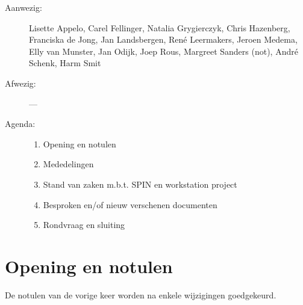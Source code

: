 

   \RosSupersedes{-}
   \MakeRosTitle
%
%
\begin{description}
\item[Aanwezig:] Lisette Appelo, Carel Fellinger, Natalia Grygierczyk,
                 Chris Hazenberg, Franciska de Jong, 
                 Jan Landsbergen, Ren\'{e} Leermakers, 
                 Jeroen Medema, Elly van Munster, 
                 Jan Odijk, Joep Rous, Margreet Sanders (not),
                 Andr\'{e} Schenk, Harm Smit
\item[Afwezig:]  ---
\item[Agenda:]\mbox{}
  \begin{enumerate}
  \item Opening en notulen
  \item Mededelingen
  \item Stand van zaken m.b.t. SPIN en workstation project
  \item Besproken en/of nieuw verschenen documenten
  \item Rondvraag en sluiting
  \end{enumerate}
\end{description}

\section{Opening en notulen}
De notulen van de vorige keer worden na enkele wijzigingen goedgekeurd.

